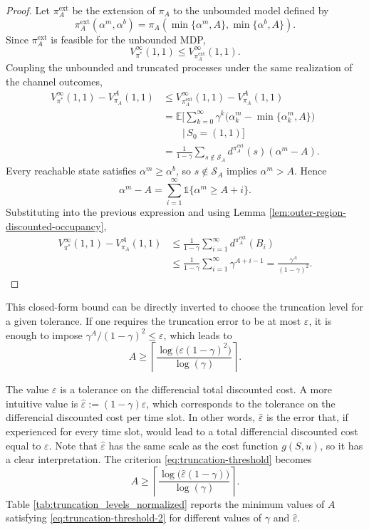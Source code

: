 \documentclass[letterpaper,journal]{IEEEtran}
\begin{document}
\begin{proof}
Let $\pi_A^{\mathrm{ext}}$ be the extension of $\pi_A$ to the unbounded model defined by
\[
\pi_A^{\mathrm{ext}}(\alpha^m,\alpha^b)=\pi_A\!\left(\min\{\alpha^m,A\},\min\{\alpha^b,A\}\right).
\]
Since $\pi_A^{\mathrm{ext}}$ is feasible for the unbounded MDP,
\[
V^\infty_{\pi^*}(1,1)\leq V^\infty_{\pi_A^{\mathrm{ext}}}(1,1).
\]
Coupling the unbounded and truncated processes under the same realization of the channel outcomes,
\begin{align*}
V^\infty_{\pi^*}(1,1)-V^A_{\pi_A}(1,1)
&\leq V^\infty_{\pi_A^{\mathrm{ext}}}(1,1)-V^A_{\pi_A}(1,1)\\
&=\mathbb E\Biggl[\sum_{k=0}^{\infty}\gamma^k
\bigl(\alpha_k^m-\min\{\alpha_k^m,A\}\bigr)\\
&\qquad\Big|\,S_0=(1,1)\Biggr]\\
&=\frac{1}{1-\gamma}
\sum_{s\notin \mathcal S_A} d^{\pi_A^{\mathrm{ext}}}(s)(\alpha^m-A).
\end{align*}
Every reachable state satisfies $\alpha^m\geq \alpha^b$, so $s\notin \mathcal S_A$ implies $\alpha^m>A$. Hence
\[
\alpha^m-A=\sum_{i=1}^{\infty}\mathds{1}\{\alpha^m\geq A+i\}.
\]
Substituting into the previous expression and using Lemma \ref{lem:outer-region-discounted-occupancy},
\begin{align*}
V^\infty_{\pi^*}(1,1)-V^A_{\pi_A}(1,1)
&\leq \frac{1}{1-\gamma}\sum_{i=1}^{\infty}
 d^{\pi_A^{\mathrm{ext}}}(B_i)\\
&\leq \frac{1}{1-\gamma}\sum_{i=1}^{\infty}\gamma^{A+i-1}
=\frac{\gamma^A}{(1-\gamma)^2}.
\end{align*}
\end{proof}

This closed-form bound can be directly inverted to choose the truncation level for a given tolerance. If one requires the truncation error to be at most $\varepsilon$, it is enough to impose $\gamma^A/(1-\gamma)^2\leq \varepsilon$, which leads to
\begin{equation}\label{eq:truncation-threshold}
A\geq \left\lceil\frac{\log\bigl(\varepsilon(1-\gamma)^2\bigr)}{\log(\gamma)}\right\rceil.
\end{equation}

The value $\varepsilon$ is a tolerance on the differencial total discounted cost. A more intuitive value is $\hat\varepsilon:=(1-\gamma)\varepsilon$, which corresponds to the tolerance on the differencial discounted cost per time slot. In other words, $\hat\varepsilon$ is the error that, if experienced for every time slot, would lead to a total differencial discounted cost equal to $\varepsilon$. Note that $\hat\varepsilon$ has the same scale as the cost function $g(S,u)$, so it has a clear interpretation. The criterion \eqref{eq:truncation-threshold} becomes
\begin{equation}\label{eq:truncation-threshold-2}
A\geq \left\lceil\frac{\log\bigl(\hat\varepsilon(1-\gamma)\bigr)}{\log(\gamma)}\right\rceil.
\end{equation}
Table \ref{tab:truncation_levels_normalized} reports the minimum values of $A$ satisfying \eqref{eq:truncation-threshold-2} for different values of $\gamma$ and $\hat\varepsilon$.
\end{document}
